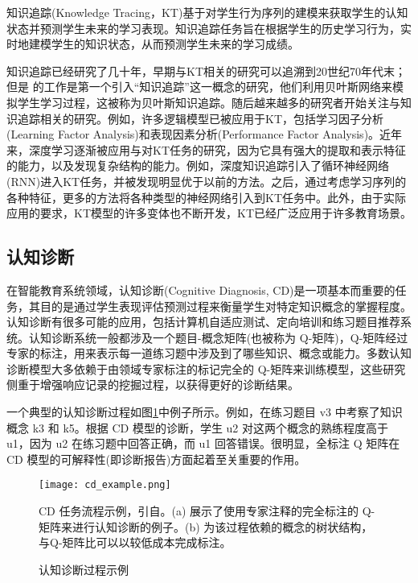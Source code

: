 知识追踪(Knowledge Tracing，KT)基于对学生行为序列的建模来获取学生的认知状态并预测学生未来的学习表现。知识追踪任务旨在根据学生的历史学习行为，实时地建模学生的知识状态，从而预测学生未来的学习成绩。

知识追踪已经研究了几十年，早期与KT相关的研究可以追溯到20世纪70年代末；但是\citet{corbett1994knowledge} 的工作是第一个引入“知识追踪”这一概念的研究，他们利用贝叶斯网络来模拟学生学习过程，这被称为贝叶斯知识追踪。随后越来越多的研究者开始关注与知识追踪相关的研究。例如，许多逻辑模型已被应用于KT，包括学习因子分析(Learning Factor Analysis)和表现因素分析(Performance Factor Analysis)。近年来，深度学习逐渐被应用与对KT任务的研究，因为它具有强大的提取和表示特征的能力，以及发现复杂结构的能力。例如，深度知识追踪引入了循环神经网络(RNN)进入KT任务，并被发现明显优于以前的方法。之后，通过考虑学习序列的各种特征，更多的方法将各种类型的神经网络引入到KT任务中。此外，由于实际应用的要求，KT模型的许多变体也不断开发，KT已经广泛应用于许多教育场景\cite{liu2021survey}。

\subsection{认知诊断}

在智能教育系统领域，认知诊断(Cognitive Diagnosis, CD)\cite{liu2023new}是一项基本而重要的任务，其目的是通过学生表现评估预测过程来衡量学生对特定知识概念的掌握程度。认知诊断有很多可能的应用，包括计算机自适应测试、定向培训和练习题目推荐系统。认知诊断系统一般都涉及一个题目-概念矩阵(也被称为 Q-矩阵)，Q-矩阵经过专家的标注，用来表示每一道练习题中涉及到了哪些知识、概念或能力。多数认知诊断模型大多依赖于由领域专家标注的标记完全的 Q-矩阵来训练模型，这些研究侧重于增强响应记录的挖掘过程，以获得更好的诊断结果。

一个典型的认知诊断过程如图\ref{fig:cd_example}中例子所示。例如，在练习题目 v3 中考察了知识概念 k3 和 k5。根据 CD 模型的诊断，学生 u2 对这两个概念的熟练程度高于 u1，因为 u2 在练习题中回答正确，而 u1 回答错误。很明显，全标注 Q 矩阵在 CD 模型的可解释性(即诊断报告)方面起着至关重要的作用\cite{chen2024disentangling}。

\begin{figure}
    \centering
    \texttt{[image: cd\_example.png]}
    \caption*{CD 任务流程示例，引自\citet{chen2024disentangling}。(a) 展示了使用专家注释的完全标注的 Q-矩阵来进行认知诊断的例子。(b) 为该过程依赖的概念的树状结构，与Q-矩阵比可以以较低成本完成标注。}
    \caption{认知诊断过程示例}
    \label{fig:cd_example}
\end{figure}

